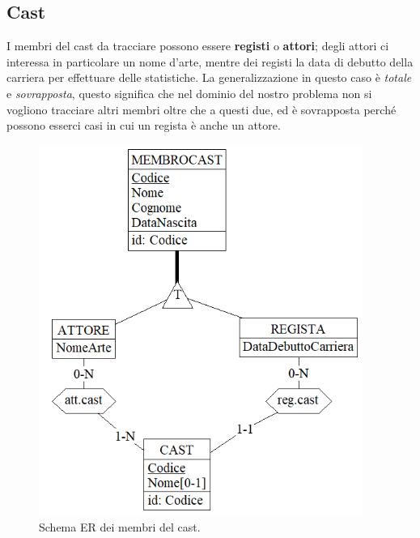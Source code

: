 \documentclass[a4paper,12pt]{report}
\begin{document}
	\subsection{Cast}
	I membri del cast da tracciare possono essere \textbf{registi} o \textbf{attori}; degli attori ci interessa in particolare un nome d'arte, mentre dei registi la data di debutto della carriera per effettuare delle statistiche. La generalizzazione in questo caso è \textit{totale} e \textit{sovrapposta}, questo significa che nel dominio del nostro problema non si vogliono tracciare altri membri oltre che a questi due, ed è sovrapposta perché possono esserci casi in cui un regista è anche un attore.
	\begin{figure}[H]
		\centering
		\includegraphics[width=300pt]{ER/cast.png}
		\caption{Schema ER dei membri del cast.}
	\end{figure}
\end{document}
